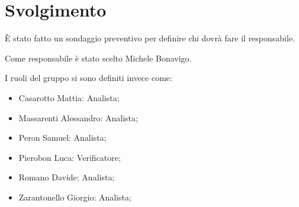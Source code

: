 \section{Svolgimento}

È stato fatto un sondaggio preventivo per definire chi dovrà fare il responsabile.

Come responsabile è stato scelto Michele Bonavigo.

I ruoli del gruppo si sono definiti invece come:
\begin{itemize}
    \item Casarotto Mattia: Analista;
    \item Massarenti Alessandro: Analista;
    \item Peron Samuel: Analista;
    \item Pierobon Luca: Verificatore;
    \item Romano Davide: Analista;
    \item Zarantonello Giorgio: Analista;
\end{itemize}
